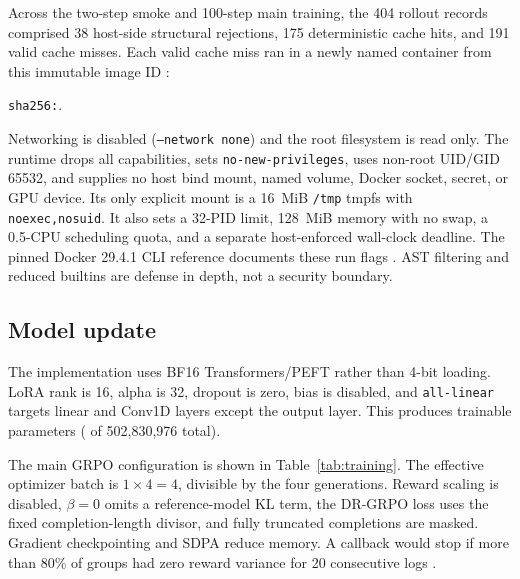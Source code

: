 \documentclass[11pt]{article}
\begin{document}
Across the two-step smoke and 100-step main training, the 404 rollout records comprised 38 host-side structural rejections, 175 deterministic cache hits, and 191 valid cache misses. Each valid cache miss ran in a newly named container from this immutable image ID \cite{runsummary}:
\begin{center}
\small\texttt{sha256:\DockerImageDigest}.
\end{center}
Networking is disabled (\texttt{--network none}) and the root filesystem is read only. The runtime drops all capabilities, sets \texttt{no-new-privileges}, uses non-root UID/GID 65532, and supplies no host bind mount, named volume, Docker socket, secret, or GPU device. Its only explicit mount is a 16~MiB \texttt{/tmp} tmpfs with \texttt{noexec,nosuid}. It also sets a 32-PID limit, 128~MiB memory with no swap, a 0.5-CPU scheduling quota, and a separate host-enforced wall-clock deadline. The pinned Docker 29.4.1 CLI reference documents these run flags \cite{dockerrun}. AST filtering and reduced builtins are defense in depth, not a security boundary.

\subsection{Model update}

The implementation uses BF16 Transformers/PEFT rather than 4-bit loading. LoRA rank is 16, alpha is 32, dropout is zero, bias is disabled, and \texttt{all-linear} targets linear and Conv1D layers except the output layer. This produces \TrainableParameters{} trainable parameters (\TrainablePercent{} of 502,830,976 total).

The main GRPO configuration is shown in Table~\ref{tab:training}. The effective optimizer batch is $1\times4=4$, divisible by the four generations. Reward scaling is disabled, $\beta=0$ omits a reference-model KL term, the DR-GRPO loss uses the fixed completion-length divisor, and fully truncated completions are masked. Gradient checkpointing and SDPA reduce memory. A callback would stop if more than 80\% of groups had zero reward variance for 20 consecutive logs \cite{trl,sourcecommit,runsummary}.
\end{document}
